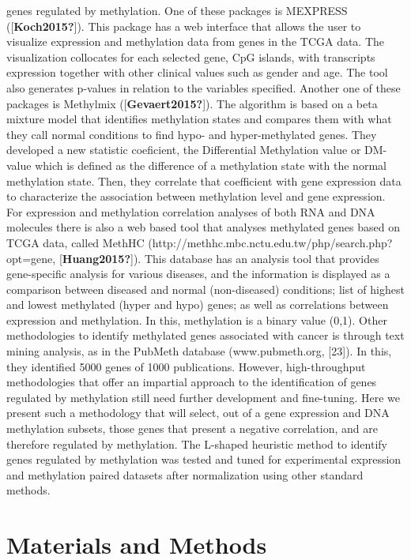 \documentclass[10pt,letterpaper]{article}
\begin{document}
genes regulated by methylation. One of these packages is MEXPRESS
({[}\textbf{Koch2015?}{]}). This package has a web interface that allows
the user to visualize expression and methylation data from genes in the
TCGA data. The visualization collocates for each selected gene, CpG
islands, with transcripts expression together with other clinical values
such as gender and age. The tool also generates p-values in relation to
the variables specified. Another one of these packages is Methylmix
({[}\textbf{Gevaert2015?}{]}). The algorithm is based on a beta mixture
model that identifies methylation states and compares them with what
they call normal conditions to find hypo- and hyper-methylated genes.
They developed a new statistic coeficient, the Differential Methylation
value or DM-value which is defined as the difference of a methylation
state with the normal methylation state. Then, they correlate that
coefficient with gene expression data to characterize the association
between methylation level and gene expression. For expression and
methylation correlation analyses of both RNA and DNA molecules there is
also a web based tool that analyses methylated genes based on TCGA data,
called MethHC (http://methhc.mbc.nctu.edu.tw/php/search.php?opt=gene,
{[}\textbf{Huang2015?}{]}). This database has an analysis tool that
provides gene-specific analysis for various diseases, and the
information is displayed as a comparison between diseased and normal
(non-diseased) conditions; list of highest and lowest methylated (hyper
and hypo) genes; as well as correlations between expression and
methylation. In this, methylation is a binary value (0,1). Other
methodologies to identify methylated genes associated with cancer is
through text mining analysis, as in the PubMeth database
(www.pubmeth.org, {[}23{]}). In this, they identified 5000 genes of 1000
publications. However, high-throughput methodologies that offer an
impartial approach to the identification of genes regulated by
methylation still need further development and fine-tuning. Here we
present such a methodology that will select, out of a gene expression
and DNA methylation subsets, those genes that present a negative
correlation, and are therefore regulated by methylation. The L-shaped
heuristic method to identify genes regulated by methylation was tested
and tuned for experimental expression and methylation paired datasets
after normalization using other standard methods.

\hypertarget{materials-and-methods}{%
\section{Materials and Methods}\label{materials-and-methods}}
\end{document}

